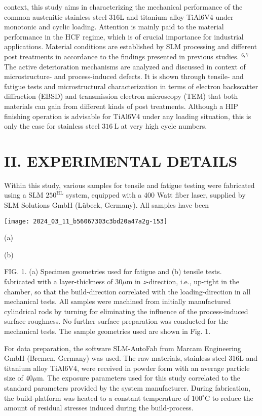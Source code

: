 \documentclass[10pt]{article}
\begin{document}
context, this study aims in characterizing the mechanical performance of the common austenitic stainless steel 316L and titanium alloy TiAl6V4 under monotonic and cyclic loading. Attention is mainly paid to the material performance in the HCF regime, which is of crucial importance for industrial applications. Material conditions are established by SLM processing and different post treatments in accordance to the findings presented in previous studies. ${ }^{6,7}$ The active deterioration mechanisms are analyzed and discussed in context of microstructure- and process-induced defects. It is shown through tensile- and fatigue tests and microstructural characterization in terms of electron backscatter diffraction (EBSD) and transmission electron microscopy (TEM) that both materials can gain from different kinds of post treatments. Although a HIP finishing operation is advisable for TiAl6V4 under any loading situation, this is only the case for stainless steel $316 \mathrm{~L}$ at very high cycle numbers.

\section*{II. EXPERIMENTAL DETAILS}
Within this study, various samples for tensile and fatigue testing were fabricated using a SLM $250^{\mathrm{HL}}$ system, equipped with a 400 Watt fiber laser, supplied by SLM Solutions GmbH (Lübeck, Germany). All samples have been

\begin{center}
\texttt{[image: 2024\_03\_11\_b56067303c3bd20a47a2g-153]}
\end{center}

(a)

(b)

FIG. 1. (a) Specimen geometries used for fatigue and (b) tensile tests.\\
fabricated with a layer-thickness of $30 \mu \mathrm{m}$ in $z$-direction, i.e., up-right in the chamber, so that the build-direction correlated with the loading-direction in all mechanical tests. All samples were machined from initially manufactured cylindrical rods by turning for eliminating the influence of the process-induced surface roughness. No further surface preparation was conducted for the mechanical tests. The sample geometries used are shown in Fig. 1.

For data preparation, the software SLM-AutoFab from Marcam Engineering GmbH (Bremen, Germany) was used. The raw materials, stainless steel 316L and titanium alloy TiAl6V4, were received in powder form with an average particle size of $40 \mu \mathrm{m}$. The exposure parameters used for this study correlated to the standard parameters provided by the system manufacturer. During fabrication, the build-platform was heated to a constant temperature of $100^{\circ} \mathrm{C}$ to reduce the amount of residual stresses induced during the build-process.
\end{document}
